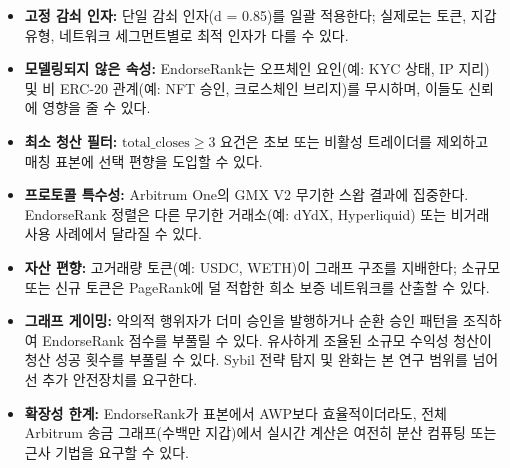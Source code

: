\begin{itemize}
\item[\textbullet] \textbf{고정 감쇠 인자:} 단일 감쇠 인자(d = 0.85)를 일괄 적용한다; 실제로는 토큰, 지갑 유형, 네트워크 세그먼트별로 최적 인자가 다를 수 있다.
\item[\textbullet] \textbf{모델링되지 않은 속성:} EndorseRank는 오프체인 요인(예: KYC 상태, IP 지리) 및 비 ERC-20 관계(예: NFT 승인, 크로스체인 브리지)를 무시하며, 이들도 신뢰에 영향을 줄 수 있다.
\item[\textbullet] \textbf{최소 청산 필터:} $\text{total\_closes} \geq 3$ 요건은 초보 또는 비활성 트레이더를 제외하고 매칭 표본에 선택 편향을 도입할 수 있다.
\end{itemize}

\begin{itemize}
\item[\textbullet] \textbf{프로토콜 특수성:} Arbitrum One의 GMX V2 무기한 스왑 결과에 집중한다. EndorseRank 정렬은 다른 무기한 거래소(예: dYdX, Hyperliquid) 또는 비거래 사용 사례에서 달라질 수 있다.
\item[\textbullet] \textbf{자산 편향:} 고거래량 토큰(예: USDC, WETH)이 그래프 구조를 지배한다; 소규모 또는 신규 토큰은 PageRank에 덜 적합한 희소 보증 네트워크를 산출할 수 있다.
\end{itemize}

\begin{itemize}
\item[\textbullet] \textbf{그래프 게이밍:} 악의적 행위자가 더미 승인을 발행하거나 순환 승인 패턴을 조직하여 EndorseRank 점수를 부풀릴 수 있다. 유사하게 조율된 소규모 수익성 청산이 청산 성공 횟수를 부풀릴 수 있다. Sybil 전략 탐지 및 완화는 본 연구 범위를 넘어선 추가 안전장치를 요구한다.
\end{itemize}

\begin{itemize}
\item[\textbullet] \textbf{확장성 한계:} EndorseRank가 표본에서 AWP보다 효율적이더라도, 전체 Arbitrum 송금 그래프(수백만 지갑)에서 실시간 계산은 여전히 분산 컴퓨팅 또는 근사 기법을 요구할 수 있다.
\end{itemize}
